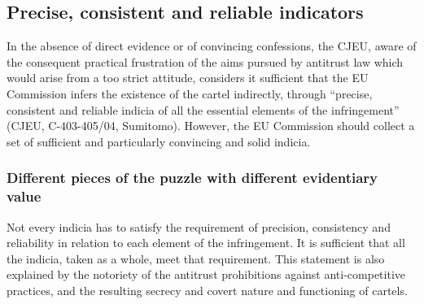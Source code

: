     \subsection{Precise, consistent and reliable indicators}

        In the absence of direct evidence or of convincing confessions, the CJEU, aware of the consequent practical frustration of the aims pursued by antitrust law which would arise from a too strict attitude, considers it sufficient that the EU Commission infers the existence of the cartel indirectly, through “precise, consistent and reliable indicia of all the essential elements of the infringement” (CJEU, C-403-405/04, Sumitomo). However, the EU Commission should collect a set of sufficient and particularly convincing and solid indicia.

        \subsubsection{Different pieces of the puzzle with different evidentiary value}

            Not every indicia has to satisfy the requirement of precision, consistency and reliability in relation to each element of the infringement. It is sufficient that all the indicia, taken as a whole, meet that requirement. This statement is also explained by the notoriety of the antitrust prohibitions against anti-competitive practices, and the resulting secrecy and covert nature and functioning of cartels.

